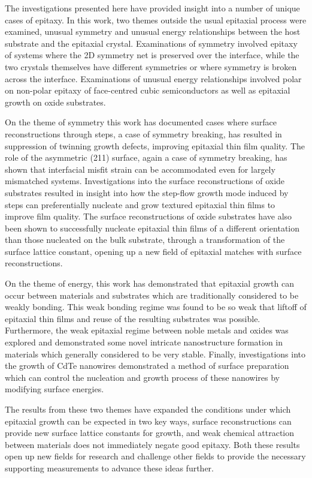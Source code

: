 The investigations presented here have provided insight into a number of unique cases of epitaxy.
In this work, two themes outside the usual epitaxial process were examined, unusual symmetry and unusual energy relationships between the host substrate and the epitaxial crystal.
Examinations of symmetry involved epitaxy of systems where the 2D symmetry net is preserved over the interface, while the two crystals themselves have different symmetries or where symmetry is broken across the interface.
Examinations of unusual energy relationships involved polar on non-polar epitaxy of face-centred cubic semiconductors as well as epitaxial growth on oxide substrates.

On the theme of symmetry this work has documented cases where surface reconstructions through steps, a case of symmetry breaking, has resulted in suppression of twinning growth defects, improving epitaxial thin film quality.
The role of the asymmetric (211) surface, again a case of symmetry breaking, has shown that interfacial misfit strain can be accommodated even for largely mismatched systems.
Investigations into the surface reconstructions of oxide substrates resulted in insight into how the step-flow growth mode induced by steps can preferentially nucleate and grow textured epitaxial thin films to improve film quality.
The surface reconstructions of oxide substrates have also been shown to successfully nucleate epitaxial thin films of a different orientation than those nucleated on the bulk substrate, through a transformation of the surface lattice constant, opening up a new field of epitaxial matches with surface reconstructions.

On the theme of energy, this work has demonstrated that epitaxial growth can occur between materials and substrates which are traditionally considered to be weakly bonding. This weak bonding regime was found to be so weak that liftoff of epitaxial thin films and reuse of the resulting substrates was possible. Furthermore, the weak epitaxial regime between noble metals and oxides was explored and demonstrated some novel intricate nanostructure formation in materials which generally considered to be very stable. Finally, investigations into the growth of CdTe nanowires demonstrated a method of surface preparation which can control the nucleation and growth process of these nanowires by modifying surface energies.

The results from these two themes have expanded the conditions under which epitaxial growth can be expected in two key ways, surface reconstructions can provide new surface lattice constants for growth, and weak chemical attraction between materials does not immediately negate good epitaxy. Both these results open up new fields for research and challenge other fields to provide the necessary supporting measurements to advance these ideas further.